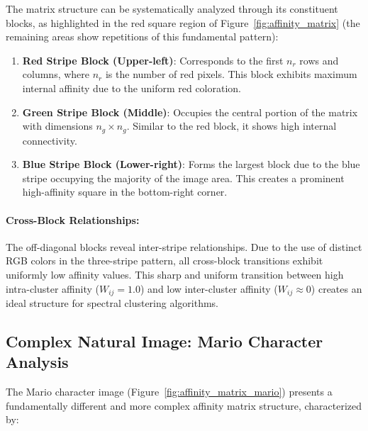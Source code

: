 \documentclass[12pt,a4paper]{article}
\begin{document}
{The matrix structure can be systematically analyzed through its constituent blocks, as highlighted in the red square region of Figure~\ref{fig:affinity_matrix} (the remaining areas show repetitions of this fundamental pattern):

\begin{enumerate}
    \item \textbf{Red Stripe Block (Upper-left)}: Corresponds to the first $n_r$ rows and columns, where $n_r$ is the number of red pixels. This block exhibits maximum internal affinity due to the uniform red coloration.
    
    \item \textbf{Green Stripe Block (Middle)}: Occupies the central portion of the matrix with dimensions $n_g \times n_g$. Similar to the red block, it shows high internal connectivity.
    
    \item \textbf{Blue Stripe Block (Lower-right)}: Forms the largest block due to the blue stripe occupying the majority of the image area. This creates a prominent high-affinity square in the bottom-right corner.
\end{enumerate}

\paragraph{Cross-Block Relationships:} The off-diagonal blocks reveal inter-stripe relationships. Due to the use of distinct RGB colors in the three-stripe pattern, all cross-block transitions exhibit uniformly low affinity values. This sharp and uniform transition between high intra-cluster affinity ($W_{ij} = 1.0$) and low inter-cluster affinity ($W_{ij} \approx 0$) creates an ideal structure for spectral clustering algorithms.



\subsection{Complex Natural Image: Mario Character Analysis}

The Mario character image (Figure~\ref{fig:affinity_matrix_mario}) presents a fundamentally different and more complex affinity matrix structure, characterized by:

}
\end{document}
